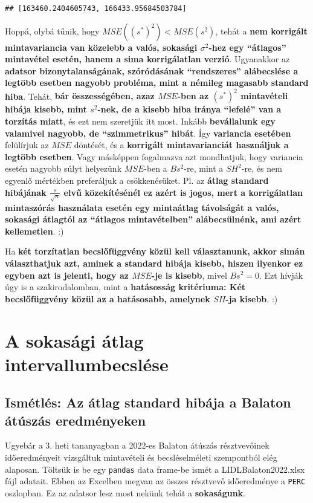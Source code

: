 \documentclass[
]{book}
\begin{document}
\begin{verbatim}
## [163460.2404605743, 166433.95684503784]
\end{verbatim}

Hoppá, olybá tűnik, hogy \(MSE((s^*)^2) < MSE(s^2)\), tehát a \textbf{nem korrigált mintavariancia van közelebb a valós, sokasági \(\sigma^2\)-hez egy ``átlagos'' mintavétel esetén, hanem a sima korrigálatlan verzió}.
Ugyanakkor az \textbf{adatsor bizonytalanságának, szóródásának ``rendszeres'' alábecslése a legtöbb esetben nagyobb probléma, mint a némileg magasabb standard hiba}. Tehát, \textbf{bár összességében, azaz \(MSE\)-ben az \((s^*)^2\) mintavételi hibája kisebb, mint \(s^2\)-nek, de a kisebb hiba iránya ``lefelé'' van a torzítás miatt}, és ezt nem szeretjük itt most. Inkább \textbf{bevállalunk egy valamivel nagyobb, de ``szimmetrikus'' hibát}.
Így \textbf{variancia esetében} felülírjuk az \(MSE\) döntését, és a \textbf{korrigált mintavarianciát használjuk a legtöbb esetben}. Vagy másképpen fogalmazva azt mondhatjuk, hogy variancia esetén nagyobb súlyt helyezünk \(MSE\)-ben a \(Bs^2\)-re, mint a \(SH^2\)-re, és nem egyenlő mértékben preferáljuk a csökkenésüket.
Pl. az \textbf{átlag standard hibájának \(\frac{s}{\sqrt{n}}\) elvű közekítésénél ez azért is jogos, mert a korrigálatlan mintaszórás használata esetén egy mintaátlag távolságát a valós, sokasági átlagtól az ``átlagos mintavételben'' alábecsülnénk, ami azért kellemetlen}. :)

Ha \textbf{két torzítatlan becslőfüggvény közül kell választanunk, akkor simán választhatjuk azt, aminek a standard hibája kisebb, hiszen ilyenkor ez egyben azt is jelenti, hogy az \(MSE\)-je is kisebb}, mivel \(Bs^2=0\). Ezt hívják úgy is a szakirodalomban, mint a \textbf{hatásosság kritériuma: Két becslőfüggvény közül az a hatásosabb, amelynek \(SH\)-ja kisebb}. :)

\chapter{A sokasági átlag intervallumbecslése}\label{a-sokasuxe1gi-uxe1tlag-intervallumbecsluxe9se}

\section{Ismétlés: Az átlag standard hibája a Balaton átúszás eredményeken}\label{ismuxe9tluxe9s-az-uxe1tlag-standard-hibuxe1ja-a-balaton-uxe1tuxfaszuxe1s-eredmuxe9nyeken}

Ugyebár a 3. heti tananyagban a 2022-es Balaton átúszás résztvevőinek időeredményeit vizsgáltuk mintavételi és becsléselméleti szempontból elég alaposan. Töltsük is be egy \texttt{pandas} data frame-be ismét a LIDLBalaton2022.xlsx fájl adatait. Ebben az Excelben megvan az összes résztvevő időeredménye a \texttt{PERC} oszlopban. Ez az adatsor lesz most nekünk tehát a \textbf{sokaságunk}.
\end{document}
